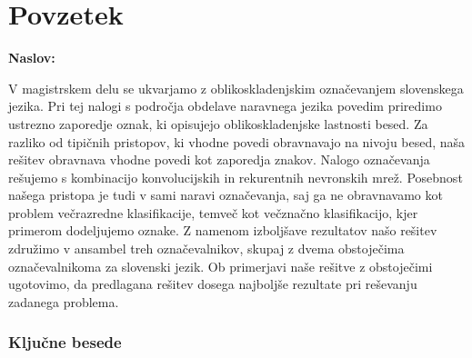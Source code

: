 \chapter*{Povzetek}

\noindent\textbf{Naslov:} \ttitle
\bigskip

V magistrskem delu se ukvarjamo z oblikoskladenjskim označevanjem slovenskega jezika. Pri tej nalogi s področja obdelave naravnega jezika povedim priredimo ustrezno zaporedje oznak, ki opisujejo oblikoskladenjske lastnosti besed. Za razliko od tipičnih pristopov, ki vhodne povedi obravnavajo na nivoju besed, naša rešitev obravnava vhodne povedi kot zaporedja znakov. Nalogo označevanja rešujemo s kombinacijo konvolucijskih in rekurentnih nevronskih mrež. Posebnost našega pristopa je tudi v sami naravi označevanja, saj ga ne obravnavamo kot problem večrazredne klasifikacije, temveč kot večznačno klasifikacijo, kjer primerom dodeljujemo oznake. Z namenom izboljšave rezultatov našo rešitev združimo v ansambel treh označevalnikov, skupaj z dvema obstoječima označevalnikoma za slovenski jezik. Ob primerjavi naše rešitve z obstoječimi ugotovimo, da predlagana rešitev dosega najboljše rezultate pri reševanju zadanega problema.

\subsection*{Ključne besede}
\textit{\tkeywords}
\clearemptydoublepage
